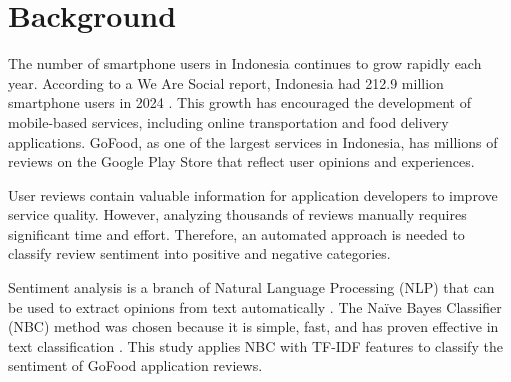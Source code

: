 \section{Background}

The number of smartphone users in Indonesia continues to grow rapidly each year. According to a We Are Social report, Indonesia had 212.9 million smartphone users in 2024 \cite{manning2008}. This growth has encouraged the development of mobile-based services, including online transportation and food delivery applications. GoFood, as one of the largest services in Indonesia, has millions of reviews on the Google Play Store that reflect user opinions and experiences.

User reviews contain valuable information for application developers to improve service quality. However, analyzing thousands of reviews manually requires significant time and effort. Therefore, an automated approach is needed to classify review sentiment into positive and negative categories.

Sentiment analysis is a branch of Natural Language Processing (NLP) that can be used to extract opinions from text automatically \cite{feldman2013}. The Na\"ive Bayes Classifier (NBC) method was chosen because it is simple, fast, and has proven effective in text classification \cite{go2019}. This study applies NBC with TF-IDF features to classify the sentiment of GoFood application reviews.
